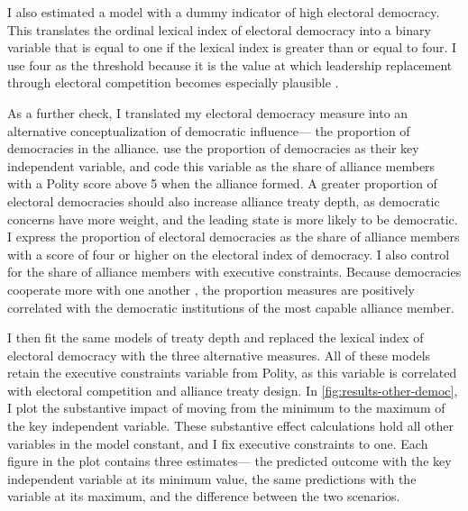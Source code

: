 \documentclass[12pt]{article}
\begin{document}
I also estimated a model with a dummy indicator of high electoral democracy. 
This translates the ordinal lexical index of electoral democracy into a binary variable that is equal to one if the lexical index is greater than or equal to four. 
I use four as the threshold because it is the value at which leadership replacement through electoral competition becomes especially plausible \citep{HydeMarinov2012}.


As a further check, I translated my electoral democracy measure into an alternative conceptualization of democratic influence--- the proportion of democracies in the alliance.
\citet{Chibaetal2015} use the proportion of democracies as their key independent variable, and code this variable as the share of alliance members with a Polity score above 5 when the alliance formed. 
A greater proportion of electoral democracies should also increase alliance treaty depth, as democratic concerns have more weight, and the leading state is more likely to be democratic. 
I express the proportion of electoral democracies as the share of alliance members with a score of four or higher on the electoral index of democracy. 
I also control for the share of alliance members with executive constraints. 
Because democracies cooperate more with one another \citep{Leeds1999}, the proportion measures are positively correlated with the democratic institutions of the most capable alliance member. 
 
I then fit the same models of treaty depth and replaced the lexical index of electoral democracy with the three alternative measures.
All of these models retain the executive constraints variable from Polity, as this variable is correlated with electoral competition and alliance treaty design. 
In \autoref{fig:results-other-democ}, I plot the substantive impact of moving from the minimum to the maximum of the key independent variable. 
These substantive effect calculations hold all other variables in the model constant, and I fix executive constraints to one. 
Each figure in the plot contains three estimates--- the predicted outcome with the key independent variable at its minimum value, the same predictions with the variable at its maximum, and the difference between the two scenarios. 
\end{document}
